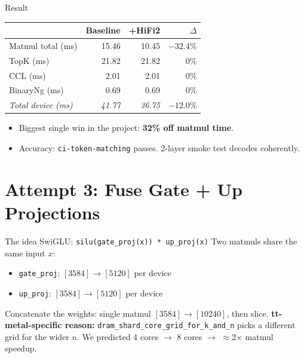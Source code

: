 \documentclass[aspectratio=169,10pt]{beamer}
\begin{document}
\begin{frame}{Result}
  \centering
  \small
  \begin{tabular}{lrrr}
    \toprule
     & Baseline & +HiFi2 & $\Delta$ \\
    \midrule
    Matmul total (ms)              & 15.46 & \alert{10.45} & \alert{${-}32.4\%$} \\
    TopK (ms)                      & 21.82 & 21.82 & $0\%$ \\
    CCL (ms)                       &  2.01 &  2.01 & $0\%$ \\
    BinaryNg (ms)                  &  0.69 &  0.69 & $0\%$ \\
    \midrule
    \emph{Total device (ms)}       & \emph{41.77} & \alert{\emph{36.75}} & \alert{${-}12.0\%$} \\
    \bottomrule
  \end{tabular}
  \vfill
  \begin{itemize}
    \item Biggest single win in the project: \textbf{32\% off matmul time}.
    \item Accuracy: \texttt{ci-token-matching} passes. 2-layer smoke
          test decodes coherently.
  \end{itemize}
\end{frame}

\section{Attempt 3: Fuse Gate + Up Projections}

\begin{frame}{The idea}
  SwiGLU: \texttt{silu(gate\_proj(x)) * up\_proj(x)}
  \vfill
  Two matmuls share the same input $x$:
  \begin{itemize}
    \item \texttt{gate\_proj}: $[3584] \to [5120]$ per device
    \item \texttt{up\_proj}:   $[3584] \to [5120]$ per device
  \end{itemize}
  Concatenate the weights: single matmul $[3584] \to [10240]$, then slice.
  \vfill
  \textbf{tt-metal-specific reason:}
  \texttt{dram\_shard\_core\_grid\_for\_k\_and\_n} picks a different
  grid for the wider $n$. We predicted 4 cores $\to$ 8 cores $\to$
  $\approx$2$\times$ matmul speedup.
\end{frame}
\end{document}

